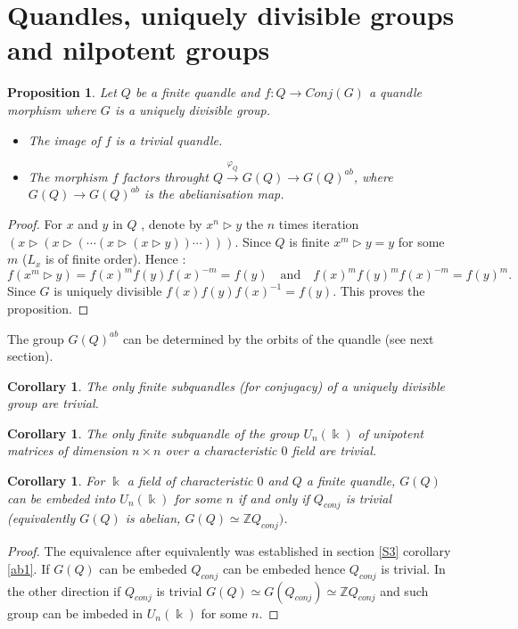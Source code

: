 \documentclass[12pt, reqno]{amsart}
\newtheorem{proposition}[theorem]{Proposition}
\newtheorem{corollary}[theorem]{Corollary}
\newcommand{\Z}{ {\mathbb Z} }
\newcommand{\K}{ {\Bbbk} }
\begin{document}
\section{Quandles, uniquely divisible groups and nilpotent groups}

\begin{proposition}
Let $Q$ be a finite quandle and $f:Q\to Conj(G)$ a quandle morphism where $G$ is a uniquely divisible group. 
\begin{itemize}
\item[1)] The image of $f$ is a trivial quandle.
\item[2)] The morphism $f$ factors throught $Q\overset{\varphi_Q}{\to} G(Q)\to G(Q)^{ab}$, where $G(Q)\to G(Q)^{ab}$ is the abelianisation map.
\end{itemize}
\end{proposition}
\begin{proof}
For $x$ and $y$ in $Q$ , denote by $x^n\triangleright y$ the $n$ times iteration $(x\triangleright(x\triangleright (\cdots (x\triangleright(x \triangleright y))\cdots)))$. Since $Q$ is finite $x^m\triangleright y=y$ for some $m$ ($L_x$ is of finite order). Hence : 
$$f(x^m\triangleright y)=f(x)^mf(y)f(x)^{-m}=f(y) \quad \text{and}\quad f(x)^mf(y)^mf(x)^{-m}=f(y)^m.$$
Since $G$ is uniquely divisible $f(x)f(y)f(x)^{-1}=f(y)$. This proves the proposition.
\end{proof}
The group $G(Q)^{ab}$ can be determined by the orbits of the quandle (see next section). 
\begin{corollary}
The only finite subquandles (for conjugacy) of a uniquely divisible group are trivial. 
\end{corollary}
\begin{corollary}
The only finite subquandle of the group $U_n(\K)$ of unipotent matrices of dimension $n\times n$ over a characteristic $0$ field are trivial.
\end{corollary}
\begin{corollary}
For $\K$ a field of characteristic $0$ and $Q$ a finite quandle, $G(Q)$ can be embeded into $U_n(\K)$ for some $n$ if and only if $Q_{conj}$ is trivial (equivalently $G(Q)$ is abelian, $G(Q)\simeq \Z Q_{conj})$. 
\end{corollary}
\begin{proof}
The equivalence after equivalently was established in section \ref{S3} corollary \ref{ab1}. If $G(Q)$ can be embeded $Q_{conj}$ can be embeded hence $Q_{conj}$ is trivial. In the other direction if $Q_{conj}$ is trivial $G(Q)\simeq G(Q_{conj}) \simeq \Z Q_{conj}$ and such group can be imbeded in $U_n(\K)$ for some $n$.
\end{proof}
\end{document}
